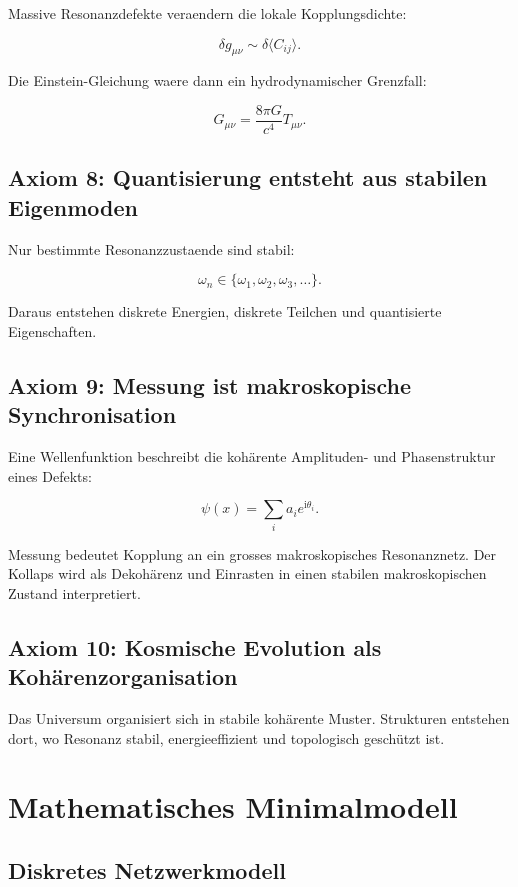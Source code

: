 \documentclass[11pt,a4paper]{article}
\newcommand{\ii}{\mathrm{i}}
\begin{document}
Massive Resonanzdefekte veraendern die lokale Kopplungsdichte:

\[
\delta g_{\mu\nu} \sim \delta \langle C_{ij}\rangle.
\]

Die Einstein-Gleichung waere dann ein hydrodynamischer Grenzfall:

\[
G_{\mu\nu} = \frac{8\pi G}{c^4}T_{\mu\nu}.
\]

\subsection{Axiom 8: Quantisierung entsteht aus stabilen Eigenmoden}

Nur bestimmte Resonanzzustaende sind stabil:

\[
\omega_n \in \{\omega_1,\omega_2,\omega_3,\ldots\}.
\]

Daraus entstehen diskrete Energien, diskrete Teilchen und quantisierte Eigenschaften.

\subsection{Axiom 9: Messung ist makroskopische Synchronisation}

Eine Wellenfunktion beschreibt die kohärente Amplituden- und Phasenstruktur eines Defekts:

\[
\psi(x)=\sum_i a_i e^{\ii\theta_i}.
\]

Messung bedeutet Kopplung an ein grosses makroskopisches Resonanznetz. Der Kollaps wird als Dekohärenz und
Einrasten in einen stabilen makroskopischen Zustand interpretiert.

\subsection{Axiom 10: Kosmische Evolution als Kohärenzorganisation}

Das Universum organisiert sich in stabile kohärente Muster. Strukturen entstehen dort, wo Resonanz stabil,
energieeffizient und topologisch geschützt ist.

\section{Mathematisches Minimalmodell}

\subsection{Diskretes Netzwerkmodell}
\end{document}
